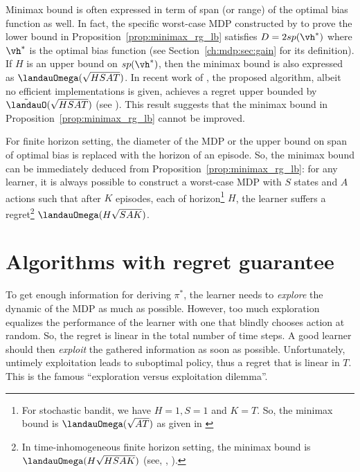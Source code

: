 Minimax bound is often expressed in term of span (or range) of the optimal bias function as well.
In fact, the specific worst-case MDP constructed by \cite{jaksch2010near} to prove the lower bound in Proposition~\ref{prop:minimax_rg_lb} satisfies $D=2sp(\vh^*)$ where $\vh^*$ is the optimal bias function (see Section~\ref{ch:mdp:sec:gain} for its definition).
If $H$ is an upper bound on $sp(\vh^*)$, then the minimax bound is also expressed as $\landauOmega(\sqrt{HSAT})$.
In recent work of \cite{zhang2019regret}, the proposed algorithm, albeit no efficient implementations is given,  achieves a regret upper bounded by $\tilde{\landauO}(\sqrt{HSAT})$ (see \cite[Theorem~1]{zhang2019regret}).
This result suggests that the minimax bound in Proposition~\ref{prop:minimax_rg_lb} cannot be improved.

For finite horizon setting, the diameter of the MDP or the upper bound on span of optimal bias is replaced with the horizon of an episode.
So, the minimax bound can be immediately deduced from Proposition~\ref{prop:minimax_rg_lb}: for any learner, it is always possible to construct a worst-case MDP with $S$ states and $A$ actions such that after $K$ episodes, each of horizon\footnote{For stochastic bandit, we have $H=1, S=1$ and $K=T$. So, the minimax bound is $\landauOmega(\sqrt{AT})$ as given in \cite{bubeck2012regret}} $H$, the learner suffers a regret\footnote{In time-inhomogeneous finite horizon setting, the minimax bound is $\landauOmega(H\sqrt{HSAK})$ (see, \eg, \cite{jin2018q, domingues2021episodic}).} $\landauOmega(H\sqrt{SAK})$.


\section{Algorithms with regret guarantee}
\label{ch:rl:sec:opt_post}

To get enough information for deriving $\pi^*$, the learner needs to \emph{explore} the dynamic of the MDP as much as possible.
However, too much exploration equalizes the performance of the learner with one that blindly chooses action at random.
So, the regret is linear in the total number of time steps.
A good learner should then \emph{exploit} the gathered information as soon as possible.
Unfortunately, untimely exploitation leads to suboptimal policy, thus a regret that is linear in $T$. This is the famous “exploration versus exploitation dilemma”.

